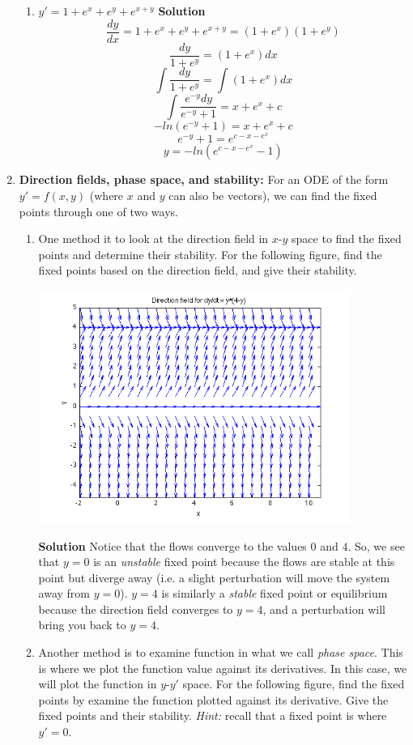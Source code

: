 \documentclass[letterpaper, fontsize=11pt]{scrartcl} %
\numberwithin{equation}{section} %
\numberwithin{figure}{section} %
\numberwithin{table}{section} %
\begin{document}
\begin{enumerate}
\begin{enumerate}
\item $y' = 1 + e^{x} + e^{y} + e^{x + y}$ \newline
\textbf{Solution}
$$\frac{dy}{dx} = 1 + e^x + e^y + e^{x+y} = (1+e^x)(1+e^y)$$
$$\frac{dy}{1+e^y} = (1 + e^x)dx$$
$$\int \frac{dy}{1+e^y} = \int (1 + e^x)dx$$
$$\int \frac{e^{-y}dy}{e^{-y} + 1} = x + e^x + c$$
$$-ln(e^{-y} + 1) = x + e^x + c$$
$$e^{-y} + 1 = e^{c - x - e^x}$$
$$y = -ln(e^{c - x - e^x} - 1)$$

\end{enumerate}

\item \textbf{Direction fields, phase space, and stability:} For an ODE of the form $y' = f(x,y)$ (where $x$ and $y$ can also be vectors), we can find the fixed points through one of two ways. 
\begin{enumerate}
\item One method it to look at the direction field in $x$-$y$ space to find the fixed points and determine their stability. For the following figure, find the fixed points based on the direction field, and give their stability. \par
\begin{center}
\includegraphics[width= 4in]{section2_1.png}
\end{center}
\textbf{Solution} \newline
Notice that the flows converge to the values $0$ and $4$. So, we see that $y = 0$ is an \textit{unstable} fixed point because the flows are stable at this point but diverge away (i.e. a slight perturbation will move the system away from $y = 0$). $y = 4$ is similarly a \textit{stable} fixed point or equilibrium because the direction field converges to $y = 4$, and a perturbation will bring you back to $y = 4$. \par
\item Another method is to examine function in what we call \textit{phase space}. This is where we plot the function value against its derivatives. In this case, we will plot the function in $y$-$y'$ space. For the following figure, find the fixed points by examine the function plotted against its derivative. Give the fixed points and their stability. \textit{Hint:} recall that a fixed point is where $y' = 0$. \newline

\end{enumerate}
\end{enumerate}
\end{document}
